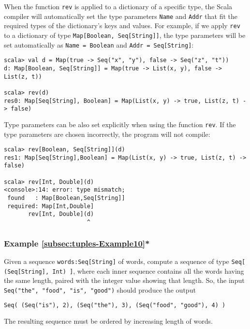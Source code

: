 When the function \lstinline!rev!
is applied to a dictionary of a specific type, the Scala compiler
will automatically set the type parameters \lstinline!Name!
and \lstinline!Addr! that
fit the required types of the dictionary's keys and values. For example,
if we apply \lstinline!rev!
to a dictionary of type \lstinline!Map[Boolean, Seq[String]]!,
the type parameters will be set automatically as \lstinline!Name = Boolean!
and \lstinline!Addr = Seq[String]!:
\begin{lstlisting}
scala> val d = Map(true -> Seq("x", "y"), false -> Seq("z", "t"))
d: Map[Boolean, Seq[String]] = Map(true -> List(x, y), false -> List(z, t))

scala> rev(d)
res0: Map[Seq[String], Boolean] = Map(List(x, y) -> true, List(z, t) -> false)
\end{lstlisting}
Type parameters can be also set explicitly when using the function
\lstinline!rev!. If the
type parameters are chosen incorrectly, the program will not compile:
\begin{lstlisting}
scala> rev[Boolean, Seq[String]](d)
res1: Map[Seq[String],Boolean] = Map(List(x, y) -> true, List(z, t) -> false)

scala> rev[Int, Double](d)
<console>:14: error: type mismatch;
 found   : Map[Boolean,Seq[String]]
 required: Map[Int,Double]
       rev[Int, Double](d)
                        ^
\end{lstlisting}

\subsubsection{Example \label{subsec:tuples-Example10}\ref{subsec:tuples-Example10}{*}}

Given a sequence \lstinline!words:Seq[String]!
of words, compute a sequence of type \lstinline!Seq[ (Seq[String], Int) ]!,
where each inner sequence contains all the words having the same length,
paired with the integer value showing that length. So, the input \lstinline!Seq("the", "food", "is", "good")!
should produce the output 
\begin{lstlisting}
Seq( (Seq("is"), 2), (Seq("the"), 3), (Seq("food", "good"), 4) )
\end{lstlisting}
The resulting sequence must be ordered by increasing length of words.

